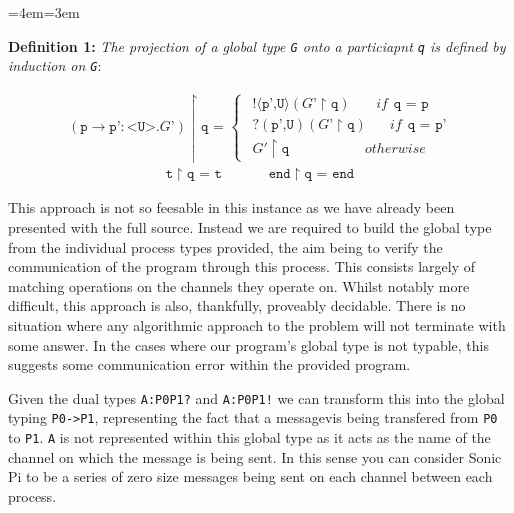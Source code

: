 \documentclass[11pt, abstracton, twoside]{scrartcl}
\newenvironment{blockquote}{
	\par
	\medskip
	\leftskip=4em\rightskip=3em
	\noindent\ignorespaces
}{
	\par\medskip
}
\begin{document}
\begin{blockquote}
  \textbf{Definition 1:} \emph{The projection of a global type \texttt{G} onto 
  a particiapnt \texttt{q} is defined by induction on \texttt{G}}:
\end{blockquote}
\begin{align*}
  (\texttt{p} \rightarrow \texttt{p'}:\texttt{<U>}.\texttt{$G$'}) \upharpoonright \texttt{q = }  
  \begin{cases}
\hspace{5pt} !\langle \texttt{p',U} \rangle (\texttt{$G$'}\upharpoonright \texttt{q}) \hspace{22pt}if \hspace{5pt} \texttt{q = p} \\
\hspace{5pt} ?(\texttt{p',U}) (\texttt{$G$'}\upharpoonright \texttt{q}) \hspace{20pt}if \hspace{5pt} \texttt{q = p'} \\
\hspace{5pt} \texttt{$G'$}\upharpoonright \texttt{q} \hspace{65pt} otherwise
  \end{cases}
\end{align*}
\begin{align*}
  \texttt{t} \upharpoonright \texttt{q = t} 
  \hspace{40pt} \texttt{end} \upharpoonright \texttt{q = end}
\end{align*}

This approach is not so feesable in this instance as we have already been 
presented with the full source. Instead we are required to build the global
type from the individual process types provided, the aim being to verify
the communication of the program through this process. This consists largely of 
matching operations on the channels they operate on. Whilst notably more
difficult, this approach is also, thankfully, proveably decidable. There is
no situation where any algorithmic approach to the problem will not terminate
with some answer. In the cases where our program's global type is not
typable, this suggests some communication error within the provided program.

Given the dual types \texttt{A:P0P1?} and \texttt{A:P0P1!} we can transform 
this into the global typing \texttt{P0->P1}, representing the fact that a 
messagevis being transfered from \texttt{P0} to \texttt{P1}. \texttt{A} is not
represented within this global type as it acts as the name of the channel on
which the message is being sent. In this sense you can consider Sonic Pi
to be a series of zero size messages being sent on each channel between
each process.
\end{document}
